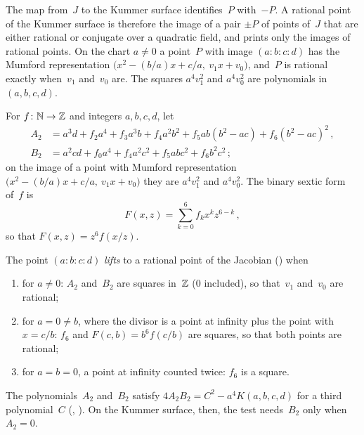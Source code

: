 The map from~$J$ to the Kummer surface identifies~$P$ with~$-P$. A rational point of the Kummer
surface is therefore the image of a pair $\pm P$ of points of~$J$ that are either rational or
conjugate over a quadratic field, and \jpoints{} prints only the images of rational points. On the
chart $a \ne 0$ a point~$P$ with image $(a : b : c : d)$ has the Mumford representation
$\bigl(x^2 - (b/a) x + c/a,\ v_1 x + v_0\bigr)$, and~$P$ is rational exactly when~$v_1$ and~$v_0$
are. The squares $a^4 v_1^2$ and $a^4 v_0^2$ are polynomials in $(a, b, c, d)$.

\begin{definition}\label{def:auxA2}
  \leanok
  For $f \colon \mathbb{N} \to \mathbb{Z}$ and integers $a, b, c, d$, let
  \[ \begin{aligned}
     A_2 &= a^3 d + f_2 a^4 + f_3 a^3 b + f_4 a^2 b^2 + f_5 ab (b^2 - ac) + f_6 (b^2 - ac)^2\,, \\
     B_2 &= a^2 c d + f_0 a^4 + f_4 a^2 c^2 + f_5 a b c^2 + f_6 b^2 c^2\,;
  \end{aligned} \]
  on the image of a point with Mumford representation $\bigl(x^2 - (b/a) x + c/a,\ v_1 x + v_0\bigr)$
  they are $a^4 v_1^2$ and $a^4 v_0^2$. The binary sextic form of~$f$ is
  \[ F(x, z) = \sum_{k=0}^{6} f_k x^k z^{6-k}\,, \]
  so that $F(x, z) = z^6 f(x/z)$.
\end{definition}

\begin{definition}\label{def:Lifts}
  \leanok
  The point $(a : b : c : d)$ \emph{lifts} to a rational point of the Jacobian
  () when
  \begin{enumerate}
    \item for $a \ne 0$: $A_2$ and~$B_2$ are squares in~$\mathbb{Z}$ ($0$ included), so that~$v_1$
      and~$v_0$ are rational;
    \item for $a = 0 \ne b$, where the divisor is a point at infinity plus the point with
      $x = c/b$: $f_6$ and $F(c, b) = b^6 f(c/b)$ are squares, so that both points are rational;
    \item for $a = b = 0$, a point at infinity counted twice: $f_6$ is a square.
  \end{enumerate}
\end{definition}

The polynomials~$A_2$ and~$B_2$ satisfy $4 A_2 B_2 = C^2 - a^4 K(a, b, c, d)$ for a third
polynomial~$C$ (, ). On the Kummer
surface, then, the test needs~$B_2$ only when $A_2 = 0$.

